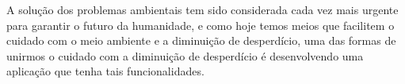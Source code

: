 \documentclass[
	12pt,				%
	openright,			%
	twoside,			%
	a4paper,			%
	english,			%
	brazil				%
	]{abntex2}
\begin{document}
A solução dos problemas ambientais tem sido considerada cada vez mais urgente para garantir o futuro da humanidade, e como hoje temos meios que facilitem o cuidado com o meio ambiente e a diminuição de desperdício, uma das formas de unirmos o cuidado com a diminuição de desperdício é desenvolvendo uma aplicação que tenha tais funcionalidades.

\postextual

% 


%
%


\end{document}
